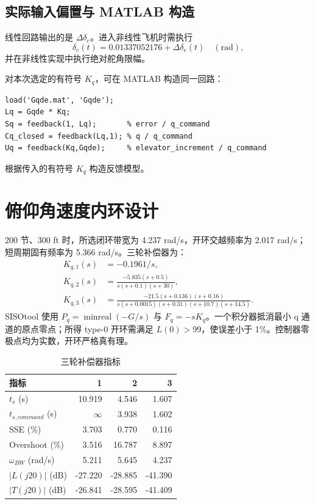 \documentclass[UTF8,a4paper,11pt,fontset=windows]{ctexart}
\newcommand{\de}{\delta_e}
\newcommand{\file}[1]{\mbox{\texttt{\small\detokenize{#1}}}}
\begin{document}
\subsection{实际输入偏置与 MATLAB 构造}
线性回路输出的是 $\Delta\de$。进入非线性飞机时需执行
\begin{equation}
\de(t)=0.01337052176+\Delta\de(t)\quad(\mathrm{rad}),
\end{equation}
并在非线性实现中执行绝对舵角限幅。

对本次选定的有符号 $K_q$，可在 MATLAB 构造同一回路：
\begin{lstlisting}
load('Gqde.mat', 'Gqde');
Lq = Gqde * Kq;
Sq = feedback(1, Lq);       % error / q_command
Cq_closed = feedback(Lq,1); % q / q_command
Uq = feedback(Kq,Gqde);     % elevator_increment / q_command
\end{lstlisting}
\file{loop.m} 根据传入的有符号 $K_q$ 构造反馈模型。

\clearpage\section{俯仰角速度内环设计}
200 节、300 ft 时，所选闭环带宽为 4.237 rad/s，开环交越频率为 2.017 rad/s；短周期固有频率为 5.366 rad/s。三轮补偿器为：
\begin{align}
K_{q,1}(s)&=-0.1961/s,\\
K_{q,2}(s)&=\frac{-5.835(s+0.5)}{s(s+0.1)(s+30)},\\
K_{q,3}(s)&=\frac{-21.5(s+0.136)(s+0.16)}{s(s+0.0015)(s+0.31)(s+10.7)(s+14.5)}.
\end{align}
SISOtool 使用 $P_q=\operatorname{minreal}(-G/s)$ 与 $F_q=-sK_q$。一个积分器抵消最小 q 通道的原点零点；所得 type-0 开环需满足 $L(0)>99$，使误差小于 1\%。控制器零极点均为实数，开环严格真有理。
\begin{table}[H]\centering\small\caption{三轮补偿器指标}
\begin{tabular}{lrrr}\toprule
指标 & 1 & 2 & 3\\\midrule
$t_s$ (s) & 10.919 & 4.546 & 1.607\\
$t_{s,command}$ (s) & $\infty$ & 3.938 & 1.602\\
SSE (\%) & 3.703 & 0.770 & 0.116\\
Overshoot (\%) & 3.516 & 16.787 & 8.897\\
$\omega_{BW}$ (rad/s) & 5.211 & 5.645 & 4.237\\
$|L(j20)|$ (dB) & -27.220 & -28.885 & -41.390\\
$|T(j20)|$ (dB) & -26.841 & -28.595 & -41.409\\
\bottomrule\end{tabular}\end{table}
\end{document}
